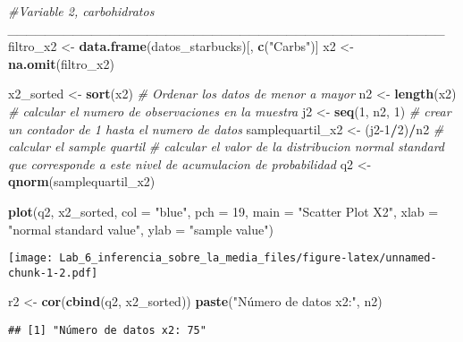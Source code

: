 \documentclass[
]{article}
\newenvironment{Shaded}{\begin{snugshade}}{\end{snugshade}}
\newcommand{\AttributeTok}[1]{\textcolor[rgb]{0.13,0.29,0.53}{#1}}
\newcommand{\CommentTok}[1]{\textcolor[rgb]{0.56,0.35,0.01}{\textit{#1}}}
\newcommand{\DecValTok}[1]{\textcolor[rgb]{0.00,0.00,0.81}{#1}}
\newcommand{\FunctionTok}[1]{\textcolor[rgb]{0.13,0.29,0.53}{\textbf{#1}}}
\newcommand{\NormalTok}[1]{#1}
\newcommand{\OtherTok}[1]{\textcolor[rgb]{0.56,0.35,0.01}{#1}}
\newcommand{\SpecialCharTok}[1]{\textcolor[rgb]{0.81,0.36,0.00}{\textbf{#1}}}
\newcommand{\StringTok}[1]{\textcolor[rgb]{0.31,0.60,0.02}{#1}}
\begin{document}
\begin{Shaded}
\begin{Highlighting}[]
\CommentTok{\#Variable 2, carbohidratos \_\_\_\_\_\_\_\_\_\_\_\_\_\_\_\_\_\_\_\_\_\_\_\_\_\_\_\_\_\_\_\_\_\_\_\_\_\_\_\_\_\_\_\_\_\_\_}
\NormalTok{filtro\_x2 }\OtherTok{\textless{}{-}} \FunctionTok{data.frame}\NormalTok{(datos\_starbucks)[, }\FunctionTok{c}\NormalTok{(}\StringTok{"Carbs"}\NormalTok{)]}
\NormalTok{x2 }\OtherTok{\textless{}{-}} \FunctionTok{na.omit}\NormalTok{(filtro\_x2)}

\NormalTok{x2\_sorted }\OtherTok{\textless{}{-}} \FunctionTok{sort}\NormalTok{(x2) }\CommentTok{\# Ordenar los datos de menor a mayor}
\NormalTok{n2 }\OtherTok{\textless{}{-}} \FunctionTok{length}\NormalTok{(x2) }\CommentTok{\# calcular el numero de observaciones en la muestra}
\NormalTok{j2 }\OtherTok{\textless{}{-}} \FunctionTok{seq}\NormalTok{(}\DecValTok{1}\NormalTok{, n2, }\DecValTok{1}\NormalTok{) }\CommentTok{\# crear un contador de 1 hasta el numero de datos}
\NormalTok{samplequartil\_x2 }\OtherTok{\textless{}{-}}\NormalTok{ (j2}\DecValTok{{-}1}\SpecialCharTok{/}\DecValTok{2}\NormalTok{)}\SpecialCharTok{/}\NormalTok{n2 }\CommentTok{\# calcular el sample quartil }
\CommentTok{\# calcular el valor de la distribucion normal standard que corresponde a este nivel de acumulacion de probabilidad}
\NormalTok{q2 }\OtherTok{\textless{}{-}} \FunctionTok{qnorm}\NormalTok{(samplequartil\_x2)}

\FunctionTok{plot}\NormalTok{(q2, x2\_sorted, }\AttributeTok{col =} \StringTok{"blue"}\NormalTok{, }\AttributeTok{pch =} \DecValTok{19}\NormalTok{, }\AttributeTok{main =} \StringTok{"Scatter Plot X2"}\NormalTok{, }\AttributeTok{xlab =} \StringTok{"normal standard value"}\NormalTok{, }\AttributeTok{ylab =} \StringTok{"sample value"}\NormalTok{)}
\end{Highlighting}
\end{Shaded}

\texttt{[image: Lab\_6\_inferencia\_sobre\_la\_media\_files/figure-latex/unnamed-chunk-1-2.pdf]}

\begin{Shaded}
\begin{Highlighting}[]
\NormalTok{r2 }\OtherTok{\textless{}{-}} \FunctionTok{cor}\NormalTok{(}\FunctionTok{cbind}\NormalTok{(q2, x2\_sorted))}
\FunctionTok{paste}\NormalTok{(}\StringTok{"Número de datos x2:"}\NormalTok{, n2)}
\end{Highlighting}
\end{Shaded}

\begin{verbatim}
## [1] "Número de datos x2: 75"
\end{verbatim}
\end{document}

